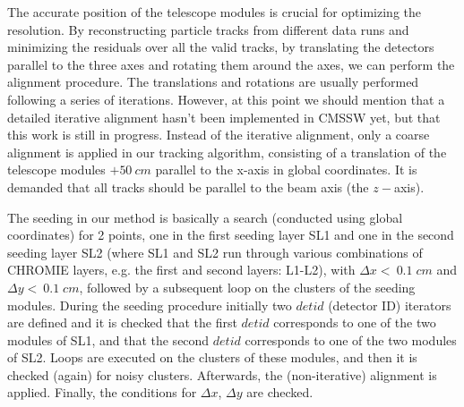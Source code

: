 \documentclass[a4paper,11pt]{article}
\begin{document}
The accurate position of the telescope modules is crucial for optimizing the resolution. By reconstructing particle tracks from different data runs and minimizing the residuals over all the valid tracks, by translating the detectors parallel to the three axes and rotating them around the axes, we can perform the alignment procedure. The translations and rotations are usually performed following a series of iterations. However, at this point we should mention that a detailed iterative alignment hasn’t been implemented in CMSSW yet, but that this work is still in progress. Instead of the iterative alignment, only a coarse alignment is applied in our tracking algorithm, consisting of a translation of the telescope modules $+50\: cm$ parallel to the x-axis in global coordinates. It is demanded that all tracks should be parallel to the beam axis (the $z-$axis).

The seeding in our method is basically a search (conducted using global coordinates) for 2 points, one in the first seeding layer SL1 and one in the second seeding layer SL2 (where SL1 and SL2 run through various combinations of CHROMIE layers, e.g. the first and second layers: L1-L2), with $\Delta x <\: 0.1{\;} cm$ and $\Delta y <\: 0.1{\;} cm$, followed by a subsequent loop on the clusters of the seeding modules. During the seeding procedure initially two $detid$ (detector ID) iterators are defined and it is checked that the first $detid$ corresponds to one of the two modules of SL1, and that the second $detid$ corresponds to one of the two modules of SL2. Loops are executed on the clusters of these modules, and then it is checked (again) for noisy clusters. Afterwards, the (non-iterative) alignment is applied. Finally, the conditions for $\Delta x$, $\Delta y$ are checked.


\end{document}
